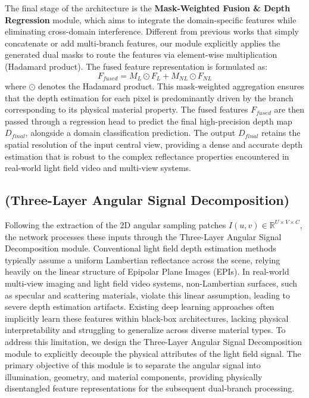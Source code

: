 The final stage of the architecture is the \textbf{Mask-Weighted Fusion \& Depth Regression} module, which aims to integrate the domain-specific features while eliminating cross-domain interference. Different from previous works that simply concatenate or add multi-branch features, our module explicitly applies the generated dual masks to route the features via element-wise multiplication (Hadamard product). The fused feature representation is formulated as:
\begin{equation}
\label{eq:eq3}
F_{fused} = M_L \odot F_L + M_{NL} \odot F_{NL}
\end{equation}
where $\odot$ denotes the Hadamard product. This mask-weighted aggregation ensures that the depth estimation for each pixel is predominantly driven by the branch corresponding to its physical material property. The fused features $F_{fused}$ are then passed through a regression head to predict the final high-precision depth map $D_{final}$, alongside a domain classification prediction. The output $D_{final}$ retains the spatial resolution of the input central view, providing a dense and accurate depth estimation that is robust to the complex reflectance properties encountered in real-world light field video and multi-view systems.

\subsection{(Three-Layer Angular Signal Decomposition)}

Following the extraction of the 2D angular sampling patches $I(u,v) \in \mathbb{R}^{U \times V \times C}$, the network processes these inputs through the Three-Layer Angular Signal Decomposition module. Conventional light field depth estimation methods typically assume a uniform Lambertian reflectance across the scene, relying heavily on the linear structure of Epipolar Plane Images (EPIs). In real-world multi-view imaging and light field video systems, non-Lambertian surfaces, such as specular and scattering materials, violate this linear assumption, leading to severe depth estimation artifacts. Existing deep learning approaches often implicitly learn these features within black-box architectures, lacking physical interpretability and struggling to generalize across diverse material types. To address this limitation, we design the Three-Layer Angular Signal Decomposition module to explicitly decouple the physical attributes of the light field signal. The primary objective of this module is to separate the angular signal into illumination, geometry, and material components, providing physically disentangled feature representations for the subsequent dual-branch processing.

